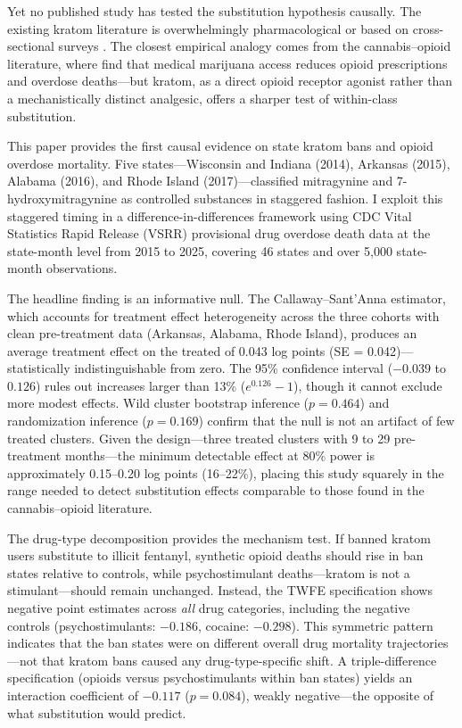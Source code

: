 \documentclass[12pt]{article}
\begin{document}
Yet no published study has tested the substitution hypothesis causally. The existing kratom literature is overwhelmingly pharmacological or based on cross-sectional surveys \citep{swogger2015experiences, boyer2008self, babin2018kratom}. The closest empirical analogy comes from the cannabis--opioid literature, where \citet{bradford2016medical, powell2018recreational, mcmichael2020impact} find that medical marijuana access reduces opioid prescriptions and overdose deaths---but kratom, as a direct opioid receptor agonist rather than a mechanistically distinct analgesic, offers a sharper test of within-class substitution.

This paper provides the first causal evidence on state kratom bans and opioid overdose mortality. Five states---Wisconsin and Indiana (2014), Arkansas (2015), Alabama (2016), and Rhode Island (2017)---classified mitragynine and 7-hydroxymitragynine as controlled substances in staggered fashion. I exploit this staggered timing in a difference-in-differences framework using CDC Vital Statistics Rapid Release (VSRR) provisional drug overdose death data at the state-month level from 2015 to 2025, covering 46 states and over 5,000 state-month observations.

The headline finding is an informative null. The Callaway--Sant'Anna estimator, which accounts for treatment effect heterogeneity across the three cohorts with clean pre-treatment data (Arkansas, Alabama, Rhode Island), produces an average treatment effect on the treated of 0.043 log points (SE = 0.042)---statistically indistinguishable from zero. The 95\% confidence interval ($-0.039$ to $0.126$) rules out increases larger than 13\% ($e^{0.126} - 1$), though it cannot exclude more modest effects. Wild cluster bootstrap inference ($p = 0.464$) and randomization inference ($p = 0.169$) confirm that the null is not an artifact of few treated clusters. Given the design---three treated clusters with 9 to 29 pre-treatment months---the minimum detectable effect at 80\% power is approximately 0.15--0.20 log points (16--22\%), placing this study squarely in the range needed to detect substitution effects comparable to those found in the cannabis--opioid literature.

The drug-type decomposition provides the mechanism test. If banned kratom users substitute to illicit fentanyl, synthetic opioid deaths should rise in ban states relative to controls, while psychostimulant deaths---kratom is not a stimulant---should remain unchanged. Instead, the TWFE specification shows negative point estimates across \emph{all} drug categories, including the negative controls (psychostimulants: $-0.186$, cocaine: $-0.298$). This symmetric pattern indicates that the ban states were on different overall drug mortality trajectories---not that kratom bans caused any drug-type-specific shift. A triple-difference specification (opioids versus psychostimulants within ban states) yields an interaction coefficient of $-0.117$ ($p = 0.084$), weakly negative---the opposite of what substitution would predict.
\end{document}
